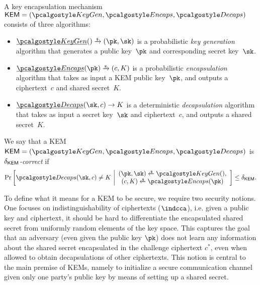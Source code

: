 \begin{definition}
    \label{def:kem}
    A key encapsulation mechanism $\KEM = (\kgen, \encaps, \decaps)$ consists of three algorithms:
    \begin{itemize}
        \item $\ul{\kgen}() \tor (\pk, \sk)$
        is a probabilistic \emph{key generation} algorithm that generates a public key~$\pk$ and corresponding secret key~$\sk$.
        \item $\ul{\encaps}(\pk) \tor (c, K)$
        is a probabilistic \emph{encapsulation} algorithm that takes as input a KEM public key~$\pk$, and outputs a ciphertext~$c$ and shared secret~$K$.
        \item $\ul{\decaps}(\sk, c) \to K$
        is a deterministic \emph{decapsulation} algorithm that takes as input a secret key~$\sk$ and ciphertext~$c$, and outputs a shared secret~$K$.
    \end{itemize}
\end{definition}

\begin{definition}
\label{def:kem-corr}
We say that a KEM~$\KEM=(\kgen, \encaps, \decaps)$ is \emph{$\delta_{\mathsf{KEM}}$-correct} if
\[
    \Pr\left[
        \decaps(\sk,c) \neq K
    ~\middle|
        \begin{array}{c}
        (\pk,\sk) \getsr \kgen(), \\
        (c, K) \getsr \encaps(\pk)
        \end{array}
    \right] \leq \delta_\KEM.
\]
\end{definition}

To define what it means for a KEM to be secure, we require two security notions. One focuses on indistinguishability of ciphertexts ($\indcca$), i.e. given a public key and ciphertext, it should be hard to differentiate the encapsulated shared secret from uniformly random elements of the key space.
This captures the goal that an adversary (even given the public key $\pk$) does not learn any information about the shared secret encapsulated in the challenge ciphertext $c^*$, even when allowed to obtain decapsulations of other ciphertexts.
This notion is central to the main premise of KEMs, namely to initialize a secure communication channel given only one party's public key by means of setting up a shared secret.

